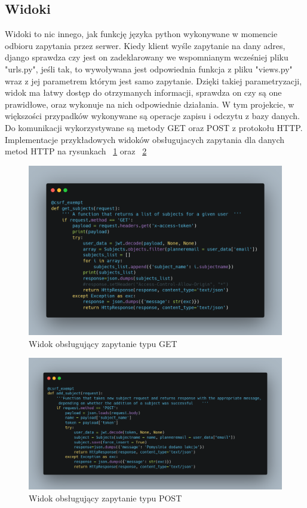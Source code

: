 \subsection{Widoki}
Widoki to nic innego, jak funkcję języka python wykonywane w momencie odbioru zapytania przez serwer. Kiedy klient wyśle zapytanie na dany adres, django sprawdza czy jest on zadeklarowany we wspomnianym wcześniej pliku "urls.py", jeśli tak, to wywoływana jest odpowiednia funkcja z pliku "views.py" wraz z jej parametrem którym jest samo zapytanie. Dzięki takiej parametryzacji, widok ma łatwy dostęp do otrzymanych informacji, sprawdza on czy są one prawidłowe, oraz wykonuje na nich odpowiednie działania. W tym projekcie, w większości przypadków wykonywane są operacje zapisu i odczytu z bazy danych. Do komunikacji wykorzystywane są metody GET oraz POST z protokołu HTTP.
Implementacje przykładowych widoków obsługujacych zapytania dla danych metod HTTP na rysunkach ~\ref{rys:BackendGet} oraz ~\ref{rys:BackendPost}
\begin{figure}[H]
	\centering\includegraphics[width=\textwidth]{figures/BackendGet}
	\caption{Widok obsługujący zapytanie typu GET}\label{rys:BackendGet}
\end{figure}
\begin{figure}[H]
	\centering\includegraphics[width=\textwidth]{figures/BackendPost}
	\caption{Widok obsługujący zapytanie typu POST}\label{rys:BackendPost}
\end{figure}

